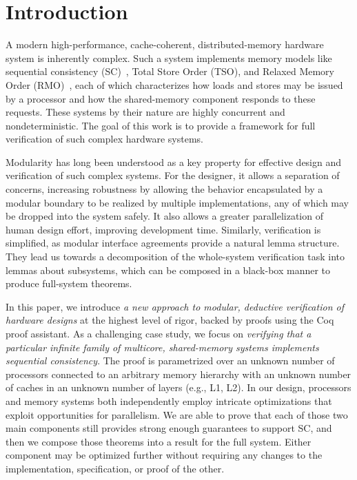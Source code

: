  \section{Introduction}
\label{sec:Introduction}

A modern high-performance, cache-coherent, distributed-memory hardware system
is inherently complex. Such a system implements memory models like sequential
consistency (SC)~\cite{lamport1979make}, Total Store Order (TSO), and Relaxed
Memory Order (RMO)~\cite{weaver1994sparc}, each of which characterizes how
loads and stores may be issued by a processor and how the shared-memory
component responds to these requests.  These systems by their nature are highly
concurrent and nondeterministic.  The goal of this work is to provide a
framework for full verification of such complex hardware systems.  

Modularity has long been understood as a key property for effective design and
verification of such complex systems. For the designer, it allows a separation
of concerns, increasing robustness by allowing the behavior encapsulated by a
modular boundary to be realized by multiple implementations, any of which may
be dropped into the system safely. It also allows a greater parallelization of
human design effort, improving development time. Similarly, verification is
simplified, as modular interface agreements provide a natural lemma structure.
They lead us towards a decomposition of the whole-system verification task
into lemmas about subsystems, which can be composed in a black-box manner to
produce full-system theorems.

In this paper, we introduce \emph{a new approach to modular, deductive
verification of hardware designs} at the highest level of rigor, backed by
proofs using the Coq proof assistant.  As a challenging case study, we focus on
\emph{verifying that a particular infinite family of multicore, shared-memory
systems implements sequential consistency}.  The proof is parametrized over an
unknown number of processors connected to an arbitrary memory hierarchy with an
unknown number of caches in an unknown number of layers (e.g., L1, L2).  In our
design, processors and memory systems both independently employ intricate
optimizations that exploit opportunities for parallelism.  We are able to prove
that each of those two main components still provides strong enough guarantees
to support SC, and then we compose those theorems into a result for the full
system.  Either component may be optimized further without requiring any
changes to the implementation, specification, or proof of the other.

